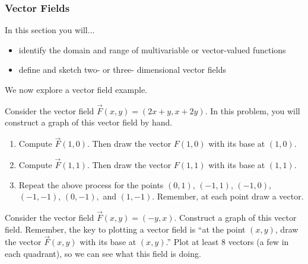 \subsubsection{Vector Fields}
In this section you will...
\begin{itemize}
\item identify the domain and range of multivariable or vector-valued functions
\item define and sketch two- or three- dimensional vector fields
\end{itemize}

We now explore a vector field example.

\begin{problem}%
%
 Consider the vector field $\vec F(x,y)=(2x+y,x+2y)$.  In this problem, you will construct a graph of this vector field by hand.
\begin{enumerate}
 \item Compute $\vec F(1,0)$. Then draw the vector $F(1,0)$ with its base at $(1,0)$.
 \item Compute $\vec F(1,1)$. Then draw the vector $F(1,1)$ with its base at $(1,1)$.
 \item Repeat the above process for the points $(0,1)$, $(-1,1)$, $(-1,0)$, $(-1,-1)$, $(0,-1),$ and $(1,-1)$. Remember, at each point draw a vector.  
\end{enumerate}
\end{problem}

\begin{problem}
%
 Consider the vector field $\vec F(x,y)=(-y,x)$. Construct a graph of this vector field. Remember, the key to plotting a vector field is ``at the point $(x,y)$, draw the vector $\vec F(x,y)$ with its base at $(x,y)$.''  Plot at least 8 vectors (a few in each quadrant), so we can see what this field is doing.
\end{problem}

